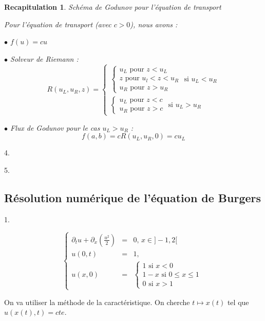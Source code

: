 \documentclass{article}
\newtheorem{recap}{Recapitulation}
\begin{document}
\begin{recap}{Schéma de Godunov pour l'équation de transport}

Pour l'équation de transport (avec $c>0$), nous avons :

$\bullet$ $f(u) = c u$

$\bullet$ Solveur de Riemann :
\[ R(u_L, u_R, z) = \left\{ \begin{matrix}
	
	\left\{ \begin{matrix}
		u_L \text{ pour } z < u_L \\
		z \text{ pour } u_l < z < u_R \\
		u_R \text{ pour } z > u_R	
	\end{matrix} \right. \text{ si } u_L < u_R \\
	
	\left\{ \begin{matrix} 
		u_L \text{ pour } z < c \\
		u_R \text{ pour } z > c
	\end{matrix} \right. \text{ si } u_L > u_R

	\end{matrix} \right. \]

$\bullet$ Flux de Godunov pour le cas $u_L > u_R$ :
\[ f(a,b) = c R(u_L,u_R,0) = c u_L \]

\end{recap}

4.

5.

\subsection{Résolution numérique de l’équation de Burgers}

1. 

\[ \left\{ \begin{matrix}
	\partial_t u + \partial_x(\frac{u^2}{2}) &=& 0 \textbf{, } x \in ]-1,2[ \\
	u(0,t) &=& 1, \\
	u(x,0) &=& \left\{ \begin{matrix}
		1 \text{ si } x<0 \\
		1-x \text{ si } 0\leq x \leq 1 \\
		0 \text{ si } x>1	
	\end{matrix} \right.
\end{matrix} \right.
\label{eq3} \tag{Burgers1}
\]

On va utiliser la méthode de la caractéristique. On cherche $t \longmapsto x(t)$ tel que $u(x(t),t) = cte$.
\end{document}
